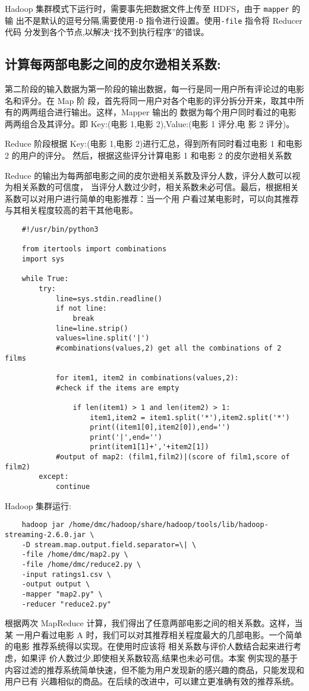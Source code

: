Hadoop 集群模式下运行时，需要事先把数据文件上传至 HDFS，由于 \lstinline|mapper| 的 输
出不是默认的逗号分隔,需要使用\lstinline|-D| 指令进行设置。使用\lstinline|-file| 指令将 Reducer
代码 分发到各个节点,以解决``找不到执行程序''的错误。

\subsection{计算每两部电影之间的皮尔逊相关系数:}\label{ux8ba1ux7b97ux6bcfux4e24ux90e8ux7535ux5f71ux4e4bux95f4ux7684ux76aeux5c14ux900aux76f8ux5173ux7cfbux6570}

第二阶段的输入数据为第一阶段的输出数据，每一行是同一用户所有评论过的电影名和评分。在
Map 阶
段，首先将同一用户对各个电影的评分拆分开来，取其中所有的两两组合进行输出。这样，Mapper
输出的 数据为每个用户同时看过的电影两两组合及其评分。即 Key:(电影 1,电影
2),Value:(电影 1 评分,电 影 2 评分)。

Reduce 阶段根据 Key:(电影 1,电影 2)进行汇总，得到所有同时看过电影 1
和电影 2 的用户的评分。 然后，根据这些评分计算电影 1 和电影 2
的皮尔逊相关系数

Reduce
的输出为每两部电影之间的皮尔逊相关系数及评分人数，评分人数可以视为相关系数的可信度，
当评分人数过少时，相关系数未必可信。最后，根据相关系数可以对用户进行简单的电影推荐：当一个用
户看过某电影时，可以向其推荐与其相关程度较高的若干其他电影。

\begin{lstlisting}
	#!/usr/bin/python3

	from itertools import combinations
	import sys

	while True:
	    try:
	        line=sys.stdin.readline()
	        if not line:
	            break
	        line=line.strip()
	        values=line.split('|')
	        #combinations(values,2) get all the combinations of 2 films

	        for item1, item2 in combinations(values,2):
	        #check if the items are empty

	            if len(item1) > 1 and len(item2) > 1:
	                item1,item2 = item1.split('*'),item2.split('*')
	                print((item1[0],item2[0]),end='')
	                print('|',end='')
	                print(item1[1]+','+item2[1])
            #output of map2: (film1,film2)|(score of film1,score of film2)
	    except:
	        continue
\end{lstlisting}

Hadoop 集群运行:

\begin{lstlisting}
	hadoop jar /home/dmc/hadoop/share/hadoop/tools/lib/hadoop-streaming-2.6.0.jar \
	-D stream.map.output.field.separator=\| \
	-file /home/dmc/map2.py \
	-file /home/dmc/reduce2.py \
	-input ratings1.csv \
	-output output \
	-mapper "map2.py" \
	-reducer "reduce2.py"
\end{lstlisting}

根据两次 MapReduce 计算，我们得出了任意两部电影之间的相关系数。这样，当某
一用户看过电影 A
时，我们可以对其推荐相关程度最大的几部电影。一个简单的电影
推荐系统得以实现。在使用时应该将
相关系数与评价人数结合起来进行考虑，如果评
价人数过少,即使相关系数较高,结果也未必可信。本案
例实现的基于内容过滤的推荐系统简单快速，但不能为用户发现新的感兴趣的商品，只能发现和用户已有
兴趣相似的商品。在后续的改进中，可以建立更准确有效的推荐系统。
